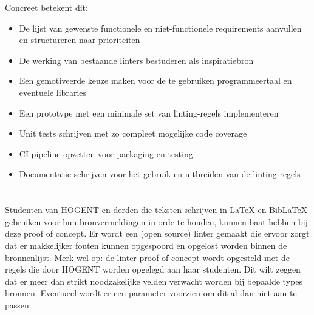 Concreet betekent dit:
\begin{itemize}
  \item De lijst van gewenste functionele en niet-functionele requirements aanvullen en structureren naar prioriteiten
  \item De werking van bestaande linters bestuderen als inspiratiebron
  \item Een gemotiveerde keuze maken voor de te gebruiken programmeertaal en eventuele libraries
  \item Een prototype met een minimale set van linting-regels implementeren
  \item Unit tests schrijven met zo compleet mogelijke code coverage
  \item CI-pipeline opzetten voor packaging en testing
  \item Documentatie schrijven voor het gebruik en uitbreiden van de linting-regels
\end{itemize}

\section{}%
\label{sec:probleemstelling}

Studenten van HOGENT en derden die teksten schrijven in LaTeX en BibLaTeX gebruiken voor hun bronvermeldingen in orde te houden, kunnen baat hebben bij deze proof of concept. Er wordt een (open source) linter gemaakt die ervoor zorgt dat er makkelijker fouten kunnen opgespoord en opgelost worden binnen de bronnenlijst. Merk wel op: de linter proof of concept wordt opgesteld met de regels die door HOGENT worden opgelegd aan haar studenten. Dit wilt zeggen dat er meer dan strikt noodzakelijke velden verwacht worden bij bepaalde types bronnen. Eventueel wordt er een parameter voorzien om dit al dan niet aan te passen.



